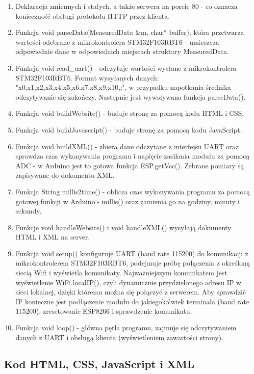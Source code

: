 \documentclass[a4paper,12pt,twoside,openany]{report}
\begin{document}
\begin{enumerate}
\item Deklaracja zmiennych i stałych, a także serwera na porcie 80 - co oznacza konieczność obsługi protokołu HTTP przez klienta.
\item Funkcja void parseData(MeasuredData \&m, char* buffer), która przetwarza wartości odebrane z mikrokontrolera STM32F103RBT6 - umieszcza odpowiednie dane w odpowiednich miejscach struktury MeasuredData.
\item Funkcja void read\_uart() - odczytuje wartości wysłane z mikrokontrolera STM32F103RBT6. Format wysyłanych danych: \\ "x0,x1,x2,x3,x4,x5,x6,x7,x8,x9,x10,;", w przypadku napotkania średnika odczytywanie się zakończy. Następnie jest wywoływana funkcja parseData().
\item Funkcja void buildWebsite() - buduje stronę za pomocą kodu HTML i CSS.
\item Funkcja void buildJavascript() - buduje stronę za pomocą kodu JavaScript.
\item Funkcja void buildXML() - zbiera dane odczytane z interfejsu UART oraz sprawdza czas wykonywania programu i napięcie zasilania modułu za pomocą ADC - w Arduino jest to gotowa funkcja ESP.getVcc(). Zebrane pomiary są zapisywane do dokumentu XML.
\item Funkcja String millis2time() - oblicza czas wykonywania programu za pomocą gotowej funkcji w Arduino - millis() oraz zamienia go na godziny, minuty i sekundy.
\item Funkcje void handleWebsite() i void handleXML() wysyłają dokumenty HTML i XML na server.
\item Funkcja void setup() konfiguruje UART (baud rate 115200) do komunikacji z mikrokontrolerem STM32F103RBT6, podejmuje próbę połączenia z określoną siecią Wifi i wyświetla komunikaty. Najważniejszym komunikatem jest wyświetlenie WiFi.localIP(), czyli dynamicznie przydzielonego adresu IP w sieci lokalnej, dzięki któremu można się połączyć z serwerem. Aby sprawdzić IP konieczne jest podłączenie modułu do jakiegokolwiek terminala (baud rate 115200), zresetowanie ESP8266 i sprawdzenie komunikatu.
\item Funkcja void loop() - główna pętla programu, zajmuje się odczytywaniem danych z UART i obsługą klienta (wyświetleniem zawartości strony).
\end{enumerate}

\subsection{Kod HTML, CSS, JavaScript i XML}
\end{document}

